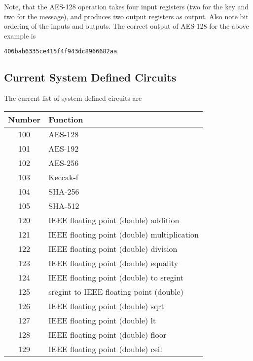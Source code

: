 Note, that the AES-128 operation takes four
input registers (two for the key and two for
the message), and produces two output registers
as output.
Also note bit ordering of the inputs and outputs.
The correct output of AES-128 for the above
example is
\begin{center}
  \verb|406bab6335ce415f4f943dc8966682aa|
\end{center}


\subsection{Current System Defined Circuits}
The current list of system defined circuits are
\begin{center}
\begin{tabular}{c|l}
Number & Function \\
\hline
100 & AES-128 \\
101 & AES-192 \\
102 & AES-256 \\
103 & Keccak-f \\
104 & SHA-256 \\
105 & SHA-512 \\
\hline
120 & IEEE floating point (double) addition \\
121 & IEEE floating point (double) multiplication \\
122 & IEEE floating point (double) division \\
123 & IEEE floating point (double) equality \\
124 & IEEE floating point (double) to sregint \\
125 & sregint to IEEE floating point (double) \\
126 & IEEE floating point (double) sqrt \\
127 & IEEE floating point (double) lt \\
128 & IEEE floating point (double) floor \\
129 & IEEE floating point (double) ceil \\
\hline
\end{tabular}
\end{center}

